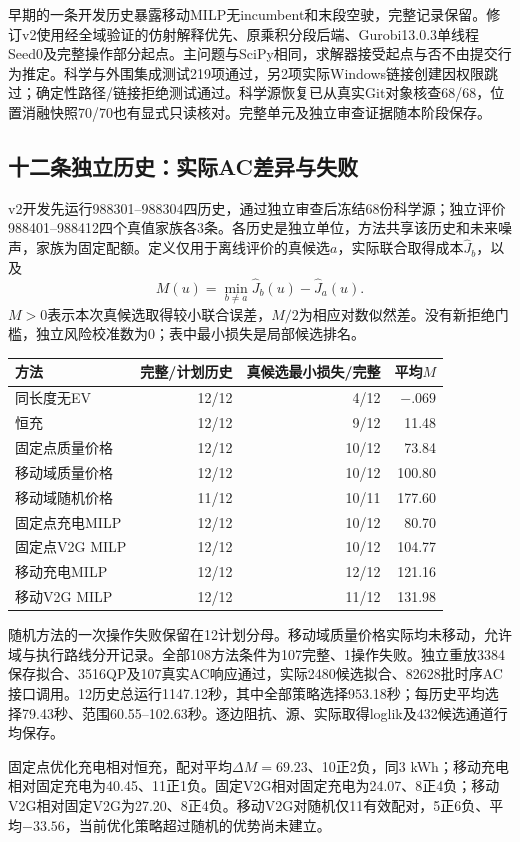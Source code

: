 \documentclass[UTF8,fontset=fandol,11pt,a4paper]{ctexart}
\begin{document}
早期的一条开发历史暴露移动MILP无incumbent和末段空驶，完整记录保留。修订v2使用经全域验证的仿射解释优先、原乘积分段后端、Gurobi13.0.3单线程Seed0及完整操作部分起点。主问题与SciPy相同，求解器接受起点与否不由提交行为推定。科学与外围集成测试219项通过，另2项实际Windows链接创建因权限跳过；确定性路径/链接拒绝测试通过。科学源恢复已从真实Git对象核查68/68，位置消融快照70/70也有显式只读核对。完整单元及独立审查证据随本阶段保存。

\subsection{十二条独立历史：实际AC差异与失败}
v2开发先运行988301--988304四历史，通过独立审查后冻结68份科学源；独立评价988401--988412四个真值家族各3条。各历史是独立单位，方法共享该历史和未来噪声，家族为固定配额。定义仅用于离线评价的真候选$a$，实际联合取得成本$\widehat J_b$，以及
\[
M(u)=\min_{b\ne a}\widehat J_b(u)-\widehat J_a(u).
\]
$M>0$表示本次真候选取得较小联合误差，$M/2$为相应对数似然差。没有新拒绝门槛，独立风险校准数为0；表中最小损失是局部候选排名。

\begin{center}\begin{tabular}{lrrr}
\toprule 方法 & 完整/计划历史 & 真候选最小损失/完整 & 平均$M$\\\midrule
同长度无EV &12/12&4/12&$-.069$\\
恒充 &12/12&9/12&11.48\\
固定点质量价格 &12/12&10/12&73.84\\
移动域质量价格 &12/12&10/12&100.80\\
移动域随机价格 &11/12&10/11&177.60\\
固定点充电MILP &12/12&10/12&80.70\\
固定点V2G MILP &12/12&10/12&104.77\\
移动充电MILP &12/12&12/12&121.16\\
移动V2G MILP &12/12&11/12&131.98\\\bottomrule
\end{tabular}\end{center}
随机方法的一次操作失败保留在12计划分母。移动域质量价格实际均未移动，允许域与执行路线分开记录。全部108方法条件为107完整、1操作失败。独立重放3384保存拟合、3516QP及107真实AC响应通过，实际2480候选拟合、82628批时序AC接口调用。12历史总运行1147.12秒，其中全部策略选择953.18秒；每历史平均选择79.43秒、范围60.55--102.63秒。逐边阻抗、源、实际取得loglik及432候选通道行均保存。

固定点优化充电相对恒充，配对平均$\Delta M=69.23$、10正2负，同3 kWh；移动充电相对固定充电为40.45、11正1负。固定V2G相对固定充电为24.07、8正4负；移动V2G相对固定V2G为27.20、8正4负。移动V2G对随机仅11有效配对，5正6负、平均$-33.56$，当前优化策略超过随机的优势尚未建立。
\end{document}
